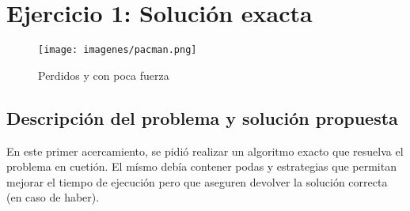 \section{Ejercicio 1: Solución exacta}

  \begin{figure}[ht]
    \begin{center}
      \texttt{[image: imagenes/pacman.png]}
      \caption{Perdidos y con poca fuerza}
    \end{center}
  \end{figure}

    \subsection{Descripción del problema y solución propuesta}
        En este primer acercamiento, se pidió realizar un algoritmo exacto que resuelva el problema en cuetión. El mísmo debía contener podas y estrategias que permitan mejorar el tiempo de ejecución pero que aseguren devolver la solución correcta (en caso de haber).


